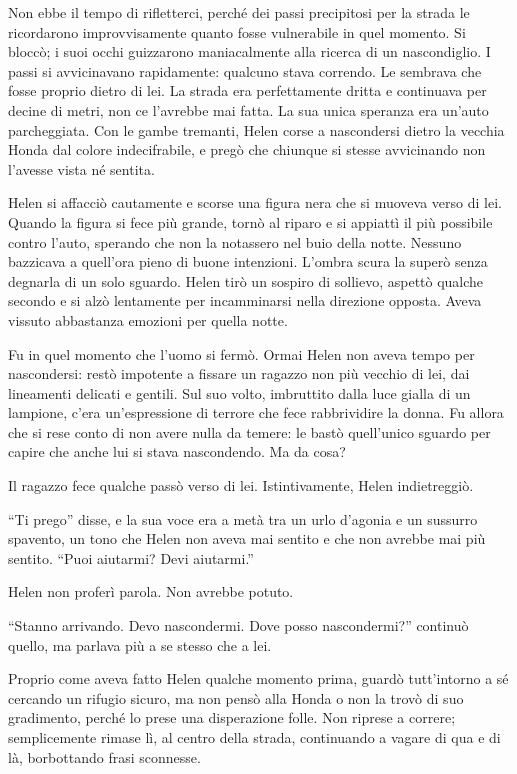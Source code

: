\documentclass[a4paper,oneside,11pt]{memoir}
\begin{document}
Non ebbe il tempo di rifletterci, perché dei passi precipitosi per la strada le ricordarono
improvvisamente quanto fosse vulnerabile in quel momento. Si bloccò; i suoi occhi guizzarono
maniacalmente alla ricerca di un nascondiglio. I passi si avvicinavano rapidamente: qualcuno stava
correndo. Le sembrava che fosse proprio dietro di lei. La strada era perfettamente dritta e
continuava per decine di metri, non ce l'avrebbe mai fatta. La sua unica speranza era un'auto
parcheggiata.  Con le gambe tremanti, Helen corse a nascondersi dietro la vecchia Honda dal colore
indecifrabile, e pregò che chiunque si stesse avvicinando non l'avesse vista né sentita.

Helen si affacciò cautamente e scorse una figura nera che si muoveva verso di lei. Quando la figura
si fece più grande, tornò al riparo e si appiattì il più possibile contro l'auto, sperando che non
la notassero nel buio della notte. Nessuno bazzicava a quell'ora pieno di buone intenzioni. L'ombra
scura la superò senza degnarla di un solo sguardo. Helen tirò un sospiro di sollievo, aspettò
qualche secondo e si alzò lentamente per incamminarsi nella direzione opposta. Aveva vissuto
abbastanza emozioni per quella notte.

Fu in quel momento che l'uomo si fermò. Ormai Helen non aveva tempo per nascondersi: restò impotente
a fissare un ragazzo non più vecchio di lei, dai lineamenti delicati e gentili. Sul suo volto,
imbruttito dalla luce gialla di un lampione, c'era un'espressione di terrore che fece rabbrividire
la donna. Fu allora che si rese conto di non avere nulla da temere: le bastò quell'unico sguardo per
capire che anche lui si stava nascondendo. Ma da cosa?

Il ragazzo fece qualche passò verso di lei. Istintivamente, Helen indietreggiò.

``Ti prego'' disse, e la sua voce era a metà tra un urlo d'agonia e un sussurro spavento, un tono
che Helen non aveva mai sentito e che non avrebbe mai più sentito. ``Puoi aiutarmi? Devi aiutarmi.''

Helen non proferì parola. Non avrebbe potuto.

``Stanno arrivando. Devo nascondermi. Dove posso nascondermi?'' continuò quello, ma parlava più a se
stesso che a lei.

Proprio come aveva fatto Helen qualche momento prima, guardò tutt'intorno a sé cercando un rifugio
sicuro, ma non pensò alla Honda o non la trovò di suo gradimento, perché lo prese una disperazione
folle. Non riprese a correre; semplicemente rimase lì, al centro della strada, continuando a vagare
di qua e di là, borbottando frasi sconnesse.
\end{document}
